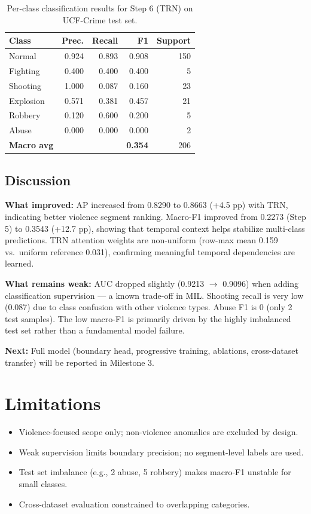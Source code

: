 \documentclass[11pt]{article}
\begin{document}
\begin{table}[h]
\centering
\small
\begin{tabular}{lrrrr}
\toprule
\textbf{Class} & \textbf{Prec.} & \textbf{Recall} & \textbf{F1} & \textbf{Support} \\
\midrule
Normal    & 0.924 & 0.893 & 0.908 & 150 \\
Fighting  & 0.400 & 0.400 & 0.400 &   5 \\
Shooting  & 1.000 & 0.087 & 0.160 &  23 \\
Explosion & 0.571 & 0.381 & 0.457 &  21 \\
Robbery   & 0.120 & 0.600 & 0.200 &   5 \\
Abuse     & 0.000 & 0.000 & 0.000 &   2 \\
\midrule
\textbf{Macro avg} & & & \textbf{0.354} & 206 \\
\bottomrule
\end{tabular}
\caption{Per-class classification results for Step 6 (TRN) on UCF-Crime test set.}
\label{tab:perclass}
\end{table}

\subsection{Discussion}

\textbf{What improved:} AP increased from 0.8290 to 0.8663 (+4.5 pp) with TRN, indicating better violence segment ranking. Macro-F1 improved from 0.2273 (Step 5) to 0.3543 (+12.7 pp), showing that temporal context helps stabilize multi-class predictions. TRN attention weights are non-uniform (row-max mean 0.159 vs.\ uniform reference 0.031), confirming meaningful temporal dependencies are learned.

\textbf{What remains weak:} AUC dropped slightly (0.9213 $\to$ 0.9096) when adding classification supervision --- a known trade-off in MIL. Shooting recall is very low (0.087) due to class confusion with other violence types. Abuse F1 is 0 (only 2 test samples). The low macro-F1 is primarily driven by the highly imbalanced test set rather than a fundamental model failure.

\textbf{Next:} Full model (boundary head, progressive training, ablations, cross-dataset transfer) will be reported in Milestone 3.

\section{Limitations}
\begin{itemize}
\item Violence-focused scope only; non-violence anomalies are excluded by design.
\item Weak supervision limits boundary precision; no segment-level labels are used.
\item Test set imbalance (e.g., 2 abuse, 5 robbery) makes macro-F1 unstable for small classes.
\item Cross-dataset evaluation constrained to overlapping categories.
\end{itemize}
\end{document}
